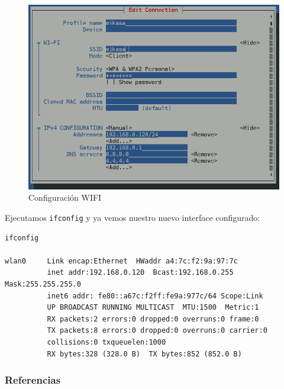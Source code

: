 \documentclass[12pt,spanish,]{article}
\begin{document}
\begin{figure}[htbp]
\centering
\includegraphics{src/img/OrangePiZero_tmtui.png}
\caption{Configuración WIFI}
\end{figure}

Ejecutamos \texttt{ifconfig} y ya vemos nuestro nuevo interface
configurado:

\begin{verbatim}
ifconfig

wlan0     Link encap:Ethernet  HWaddr a4:7c:f2:9a:97:7c
          inet addr:192.168.0.120  Bcast:192.168.0.255  Mask:255.255.255.0
          inet6 addr: fe80::a67c:f2ff:fe9a:977c/64 Scope:Link
          UP BROADCAST RUNNING MULTICAST  MTU:1500  Metric:1
          RX packets:2 errors:0 dropped:0 overruns:0 frame:0
          TX packets:8 errors:0 dropped:0 overruns:0 carrier:0
          collisions:0 txqueuelen:1000
          RX bytes:328 (328.0 B)  TX bytes:852 (852.0 B)
\end{verbatim}

\subsubsection{Referencias}\label{referencias}
\end{document}
